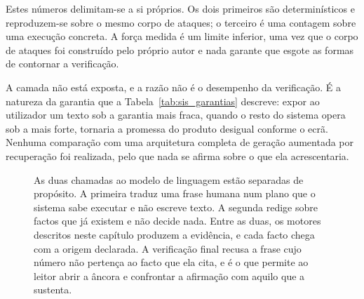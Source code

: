 Estes números delimitam-se a si próprios. Os dois primeiros são determinísticos e reproduzem-se
sobre o mesmo corpo de ataques; o terceiro é uma contagem sobre uma execução concreta. A força
medida é um limite inferior, uma vez que o corpo de ataques foi construído pelo próprio autor e
nada garante que esgote as formas de contornar a verificação.

A camada não está exposta, e a razão não é o desempenho da verificação. É a natureza da garantia
que a Tabela~\ref{tab:sis_garantias} descreve: expor ao utilizador um texto sob a garantia mais
fraca, quando o resto do sistema opera sob a mais forte, tornaria a promessa do produto desigual
conforme o ecrã. Nenhuma comparação com uma arquitetura completa de geração aumentada por
recuperação foi realizada, pelo que nada se afirma sobre o que ela acrescentaria.

\begin{figure}[htbp]
\centering
{}
\caption[A travessia de uma pergunta até ao facto que a sustenta]{As duas chamadas ao modelo de linguagem estão separadas de propósito. A primeira traduz uma frase humana num plano que o sistema sabe executar e não escreve texto. A segunda redige sobre factos que já existem e não decide nada. Entre as duas, os motores descritos neste capítulo produzem a evidência, e cada facto chega com a origem declarada. A verificação final recusa a frase cujo número não pertença ao facto que ela cita, e é o que permite ao leitor abrir a âncora e confrontar a afirmação com aquilo que a sustenta.}
\label{fig:sis_inteligencia}
\end{figure}
